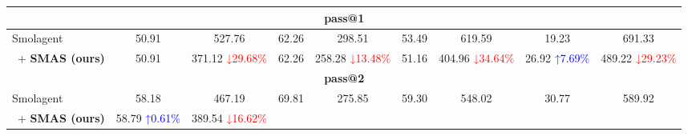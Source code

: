 \begin{table}[!t]
{\begin{tabular}{@{}lcccccccc@{}}
            \midrule
            \multicolumn{9}{c}{\bf pass@1}                                                                                                                                                                                                                                                                                                                                                \\
            \midrule
            Smolagent                                     & 50.91                                          & 527.76                                         & 62.26                           & 298.51                                & 53.49                           & 619.59                                & 19.23                           & 691.33                                \\
            \, + \textbf{SMAS (ours)}                     & 50.91                                          & 371.12 {\scriptsize \textcolor{red}{↓29.68\%}} &
            62.26                                         & 258.28 {\scriptsize \textcolor{red}{↓13.48\%}} &
            51.16                                         & 404.96 {\scriptsize \textcolor{red}{↓34.64\%}} &
            26.92 {\scriptsize \textcolor{blue}{↑7.69\%}} & 489.22 {\scriptsize \textcolor{red}{↓29.23\%}}                                                                                                                                                                                                                                                                                \\
            \midrule
            \multicolumn{9}{c}{\bf pass@2}                                                                                                                                                                                                                                                                                                                                                \\
            \midrule
            Smolagent                                     & 58.18                                          & 467.19                                         & 69.81                           & 275.85                                & 59.30                           & 548.02                                & 30.77                           & 589.92                                \\
            \, + \textbf{SMAS (ours)}                     & 58.79 {\scriptsize \textcolor{blue}{↑0.61\%}}  & 389.54 {\scriptsize \textcolor{red}{↓16.62\%}} &

\end{tabular}}
\end{table}
